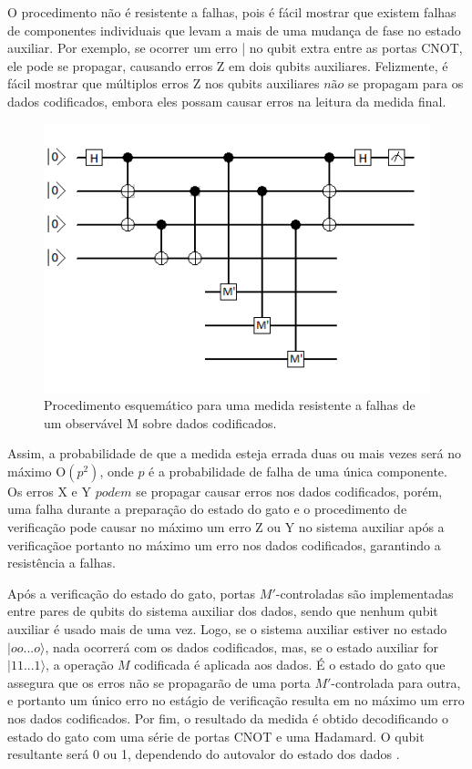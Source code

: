 \documentclass[tcc,capa]{texufpel}
\begin{document}
O procedimento não é resistente a falhas, pois é fácil mostrar que existem falhas de componentes individuais que levam a mais de uma mudança de fase no estado auxiliar. Por exemplo, se ocorrer um erro | no qubit extra entre as portas CNOT, ele pode se propagar, causando erros Z em dois qubits auxiliares. Felizmente, é fácil mostrar que múltiplos erros Z nos qubits auxiliares $não$ se propagam para os dados codificados, embora eles possam causar erros na leitura da medida final. 
\begin{figure}[ht!]
    \centering
    \includegraphics[width=.6\textwidth]{imagens/resistenteafalhas.png}
    \caption{Procedimento esquemático para uma medida resistente a falhas de um observável M sobre dados codificados.}
    \label{fig:falhas}
\end{figure}


Assim, a probabilidade de que a medida esteja errada duas ou mais vezes será no máximo O$(p^2)$, onde $p$ é a probabilidade de falha de uma única componente. Os erros X e Y $podem$ se propagar causar erros nos dados codificados, porém, uma falha durante a preparação do estado do gato e o procedimento de verificação pode causar no máximo um erro Z ou Y no sistema auxiliar após a verificaçãoe portanto no máximo um erro nos dados codificados, garantindo a resistência a falhas. 

Após a verificação do estado do gato, portas $M'$-controladas são implementadas entre pares de qubits do sistema auxiliar dos dados, sendo que nenhum qubit auxiliar é usado mais de uma vez. Logo, se o sistema auxiliar estiver no estado $|oo...o\rangle$, nada ocorrerá com os dados codificados, mas, se o estado auxiliar for $|11...1\rangle$, a operação $M$ codificada é aplicada aos dados. É o estado do gato que assegura que os erros não se propagarão de uma porta $M'$-controlada para outra, e portanto um único erro no estágio de verificação resulta em no máximo um erro nos dados codificados. Por fim, o resultado da medida é obtido decodificando o estado do gato com uma série de portas CNOT e uma Hadamard. O qubit resultante será 0 ou 1, dependendo do autovalor do estado dos dados \cite{chuang00a}. 
\end{document}
